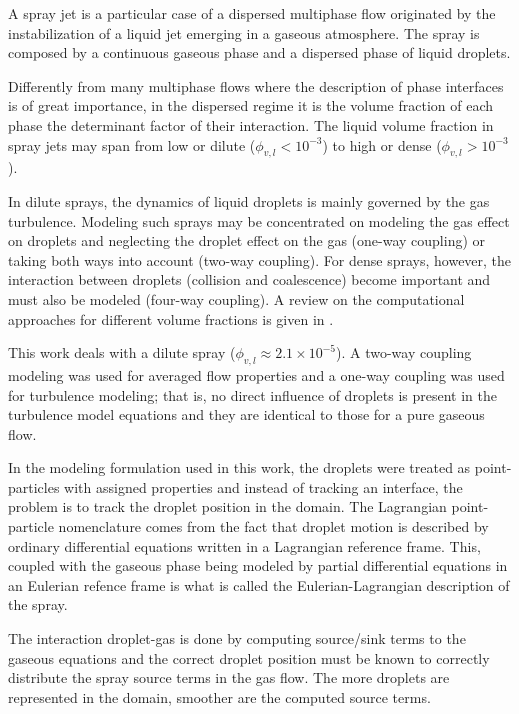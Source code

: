 A spray jet is a particular case of a dispersed multiphase flow originated by the instabilization of a liquid jet emerging in a gaseous atmosphere.  The spray is composed by a continuous gaseous phase and a dispersed phase of liquid droplets. 

Differently from many multiphase flows where the description of phase interfaces is of great importance, in the dispersed regime it is the volume fraction of each phase the determinant factor of their interaction. The liquid volume fraction in spray jets may span from low or dilute ($\phi_{v,l} < 10^{-3}$) to high or dense ($\phi_{v,l} > 10^{-3}$).

In dilute sprays, the dynamics of liquid droplets is mainly governed by the gas turbulence. Modeling such sprays may be concentrated on modeling the gas effect on droplets and neglecting the droplet effect on the gas (one-way coupling) or taking both ways into account (two-way coupling). For dense sprays, however, the interaction between droplets (collision and coalescence) become important and must also be modeled (four-way coupling). A review on the computational approaches for different volume fractions is given in \cite{balachandar2010turbulent}. 

This work deals with a dilute spray ($\phi_{v,l} \approx 2.1 \times 10^{-5}$). A two-way coupling modeling was used for averaged flow properties and a one-way coupling was used for turbulence modeling; that is, no direct influence of droplets is present in the turbulence model equations and they are identical to those for a pure gaseous flow.

In the modeling formulation used in this work, the droplets were treated as point-particles with assigned properties and instead of tracking an interface, the problem is to track the droplet position in the domain. The Lagrangian point-particle nomenclature comes from the fact that droplet motion is described by ordinary differential equations written in a Lagrangian reference frame. This, coupled with the gaseous phase being modeled by partial differential equations in an Eulerian refence frame is what is called the Eulerian-Lagrangian description of the spray.

The interaction droplet-gas is done by computing source/sink terms to the gaseous equations and the correct droplet position must be known to correctly distribute the spray source terms in the gas flow. The more droplets are represented in the domain, smoother are the computed source terms.

